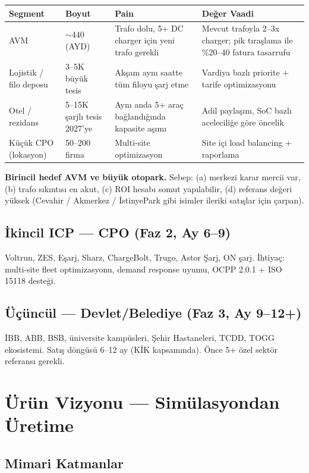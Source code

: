 \documentclass[11pt,a4paper]{article}
\begin{document}
\begin{tabularx}{\textwidth}{l l X X}
\toprule
\textbf{Segment} & \textbf{Boyut} & \textbf{Pain} & \textbf{Değer Vaadi} \\
\midrule
AVM & $\sim$440 (AYD) & Trafo dolu, 5+ DC charger için yeni trafo gerekli & Mevcut trafoyla 2--3x charger; pik tıraşlama ile \%20--40 fatura tasarrufu \\
Lojistik / filo deposu & 3--5K büyük tesis & Akşam aynı saatte tüm filoyu şarj etme & Vardiya bazlı priorite + tarife optimizasyonu \\
Otel / rezidans & 5--15K şarjlı tesis 2027'ye & Aynı anda 5+ araç bağlandığında kapasite aşımı & Adil paylaşım, SoC bazlı aceleciliğe göre öncelik \\
Küçük CPO (lokasyon) & 50--200 firma & Multi-site optimizasyon & Site içi load balancing + raporlama \\
\bottomrule
\end{tabularx}

\textbf{Birincil hedef AVM ve büyük otopark.} Sebep: (a) merkezi karar mercii var, (b) trafo sıkıntısı en akut, (c) ROI hesabı somut yapılabilir, (d) referans değeri yüksek (Cevahir / Akmerkez / İstinyePark gibi isimler ileriki satışlar için çarpan).

\subsection{İkincil ICP --- CPO (Faz 2, Ay 6--9)}
Voltrun, ZES, Eşarj, Sharz, ChargeBolt, Trugo, Astor Şarj, ON şarj. İhtiyaç: multi-site fleet optimizasyonu, demand response uyumu, OCPP 2.0.1 + ISO 15118 desteği.

\subsection{Üçüncül --- Devlet/Belediye (Faz 3, Ay 9--12+)}
İBB, ABB, BSB, üniversite kampüsleri, Şehir Hastaneleri, TCDD, TOGG ekosistemi. Satış döngüsü 6--12 ay (KİK kapsamında). Önce 5+ özel sektör referansı gerekli.

\section{Ürün Vizyonu --- Simülasyondan Üretime}

\subsection{Mimari Katmanlar}
\end{document}
